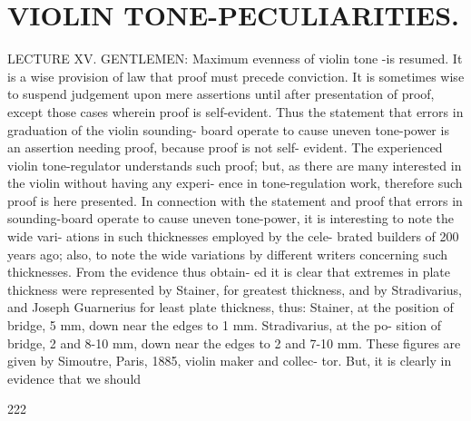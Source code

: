 \documentclass{article}
\begin{document}
\section*{VIOLIN TONE-PECULIARITIES.}
LECTURE XV. GENTLEMEN: Maximum evenness of violin tone -is resumed. It is a wise provision of law that proof must precede conviction. It is sometimes wise to suspend judgement upon mere assertions until after presentation of proof, except those cases wherein proof is self-evident. Thus the statement that errors in graduation of the violin sounding- board operate to cause uneven tone-power is an assertion needing proof, because proof is not self- evident. The experienced violin tone-regulator understands such proof; but, as there are many interested in the violin without having any experi- ence in tone-regulation work, therefore such proof is here presented. In connection with the statement and proof that errors in sounding-board operate to cause uneven tone-power, it is interesting to note the wide vari- ations in such thicknesses employed by the cele- brated builders of 200 years ago; also, to note the wide variations by different writers concerning such thicknesses. From the evidence thus obtain- ed it is clear that extremes in plate thickness were represented by Stainer, for greatest thickness, and by Stradivarius, and Joseph Guarnerius for least plate thickness, thus: Stainer, at the position of bridge, 5 mm, down near the edges to 1 mm. Stradivarius, at the po- sition of bridge, 2 and 8-10 mm, down near the edges to 2 and 7-10 mm. These figures are given by Simoutre, Paris, 1885, violin maker and collec- tor. But, it is clearly in evidence that we should

222
\end{document}
